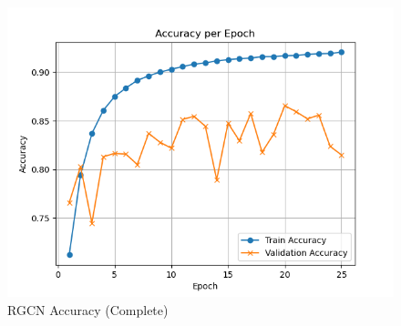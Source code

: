 \documentclass{article}
\begin{document}
\begin{figure}[h]
\begin{minipage}{0.32\textwidth}
        \includegraphics[width=\textwidth]{rgcn_acc.png}
        \caption{RGCN Accuracy (Complete)}
        \label{fig:rgcn_acc}
    \end{minipage}
    
    \vspace{0.5cm} %
    

\end{figure}
\end{document}
